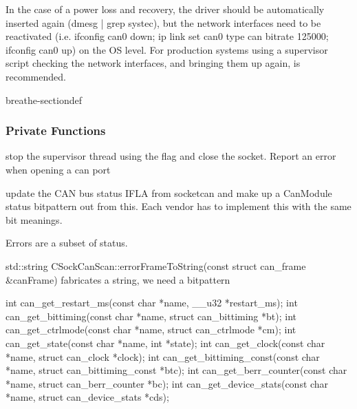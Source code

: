 \documentclass[a4paper,10pt,english]{sphinxmanual}
\begin{document}
\sphinxAtStartPar
In the case of a power loss and recovery, the driver should be automatically inserted again (dmesg | grep systec), but the network
interfaces need to be re\sphinxhyphen{}activated (i.e. ifconfig can0 down; ip link set can0 type can bitrate 125000; ifconfig can0 up) on the OS level.
For production systems using a supervisor script checking the network interfaces, and bringing them up again, is recommended.


\begin{fulllineitems}
%
\pysigstartmultiline
{}%
\pysigstopmultiline
\begin{sphinxuseclass}{breathe-sectiondef}\subsubsection*{Private Functions}


\begin{fulllineitems}
%
\pysigstartmultiline
{}%
\pysigstopmultiline
\sphinxAtStartPar
stop the supervisor thread using the flag and close the socket. Report an error when opening a can port 

\end{fulllineitems}



\begin{fulllineitems}
%
\pysigstartmultiline
{}%
\pysigstopmultiline
\sphinxAtStartPar
update the CAN bus status IFLA from socketcan and make up a CanModule status bitpattern out from this. Each vendor has to implement this with the same bit meanings.

\sphinxAtStartPar
Errors are a subset of status.

\sphinxAtStartPar
std::string CSockCanScan::errorFrameToString(const struct can\_frame \&canFrame) fabricates a string, we need a bitpattern

\sphinxAtStartPar
int can\_get\_restart\_ms(const char *name, \_\_u32 *restart\_ms); int can\_get\_bittiming(const char *name, struct can\_bittiming *bt); int can\_get\_ctrlmode(const char *name, struct can\_ctrlmode *cm); int can\_get\_state(const char *name, int *state); int can\_get\_clock(const char *name, struct can\_clock *clock); int can\_get\_bittiming\_const(const char *name, struct can\_bittiming\_const *btc); int can\_get\_berr\_counter(const char *name, struct can\_berr\_counter *bc); int can\_get\_device\_stats(const char *name, struct can\_device\_stats *cds); 


\end{fulllineitems}
\end{sphinxuseclass}
\end{fulllineitems}
\end{document}
